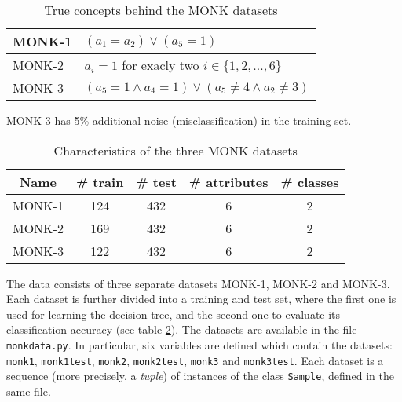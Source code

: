 \documentclass[11pt]{article}
\begin{document}
\begin{table}
  \caption{True concepts behind the MONK datasets \label{tab:truemonk}}
  \begin{center}
    \begin{tabular}{|l|l|}
      \hline
      MONK-1 & \((a_1=a_2)\vee(a_5=1)\)\\
      \hline
      MONK-2 & \(a_i=1\) for exacly two \(i \in \{1, 2, \ldots, 6\}\)\\
      \hline
      MONK-3 & \((a_5=1 \wedge a_4=1) \vee (a_5\ne 4 \wedge a_2\ne 3)\)\\
      \hline
    \end{tabular}
  \end{center}
  MONK-3 has 5\% additional noise (misclassification) in the training set.
\end{table}

\begin{table}
  \caption{Characteristics of the three MONK datasets \label{tab:monk}}
  \begin{center}
    \begin{tabular}{|c|c|c|c|c|}\hline
      Name & \# train & \# test & \# attributes & \# classes\\ \hline \hline
      MONK-1 & 124 & 432 & 6 & 2\\ \hline
      MONK-2 & 169 & 432 & 6 & 2\\ \hline
      MONK-3 & 122 & 432 & 6 & 2\\ \hline
    \end{tabular}
  \end{center}
\end{table}

The data consists of three separate datasets MONK-1, MONK-2 and
MONK-3.  Each dataset is further divided into a training and test set,
where the first one is used for learning the decision tree, and the
second one to evaluate its classification accuracy (see table
\ref{tab:monk}).  The datasets are available in
the file \verb!monkdata.py!.  In particular, six variables are defined
which contain the datasets:
\verb!monk1!, \verb!monk1test!, \verb!monk2!,
\verb!monk2test!, \verb!monk3! and \verb!monk3test!.
Each dataset is a sequence (more precisely, a \emph{tuple}) of instances
of the class \texttt{Sample}, defined in the same file.
\end{document}
